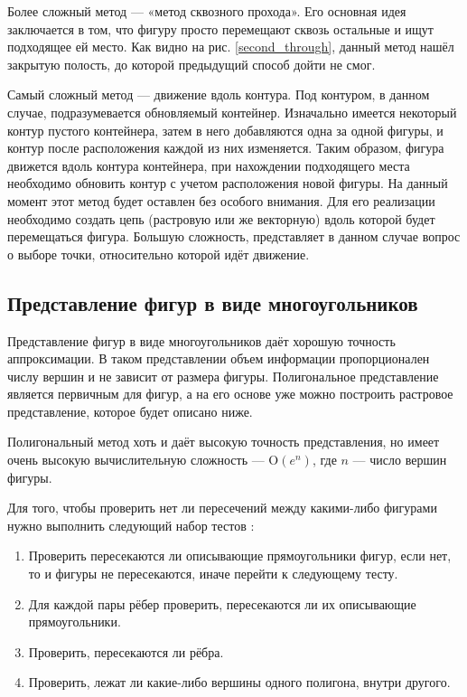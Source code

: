 \documentclass[14pt]{extarticle}
\begin{document}
	Более сложный метод --- «метод сквозного прохода». Его основная идея заключается в том, что фигуру просто перемещают сквозь остальные и ищут подходящее ей место. Как 	видно на рис. \ref{second_through}, данный метод нашёл закрытую полость, до которой предыдущий способ дойти не смог.
	


	Самый сложный метод --- движение вдоль контура. Под контуром, в данном случае,
	подразумевается обновляемый контейнер. Изначально имеется некоторый контур пустого контейнера, затем в него добавляются одна за одной фигуры, и контур после расположения каждой из них изменяется. Таким образом, фигура движется вдоль контура контейнера, при нахождении подходящего места необходимо обновить контур с учетом расположения новой фигуры. На данный момент этот метод будет оставлен без особого внимания. Для его реализации необходимо создать цепь (растровую или же векторную) вдоль которой будет перемещаться фигура. Большую сложность, представляет в данном случае вопрос о выборе точки, относительно которой идёт движение.
	\subsection{Представление фигур в виде многоугольников}
	Представление фигур в виде многоугольников даёт хорошую точность аппроксимации. В таком представлении объем информации пропорционален числу вершин и не зависит от размера фигуры. Полигональное представление является первичным для фигур, а на его основе уже можно построить растровое представление, которое будет описано ниже.


	Полигональный метод хоть и даёт высокую точность представления, но имеет очень высокую вычислительную сложность --- $\mathrm{O}(e^n)$, где $n$ --- число вершин фигуры.


	Для того, чтобы проверить нет ли пересечений между какими-либо фигурами нужно
	выполнить следующий набор тестов \cite{Benell_Olivera}:
	\begin{enumerate}
		\item Проверить пересекаются ли описывающие прямоугольники фигур, если нет, то и фигуры не пересекаются, иначе перейти к следующему тесту.
		\item Для каждой пары рёбер проверить, пересекаются ли их описывающие прямоугольники.
		\item Проверить, пересекаются ли рёбра.
		\item Проверить, лежат ли какие-либо вершины одного полигона, внутри другого.
	\end{enumerate}
	
\end{document}

